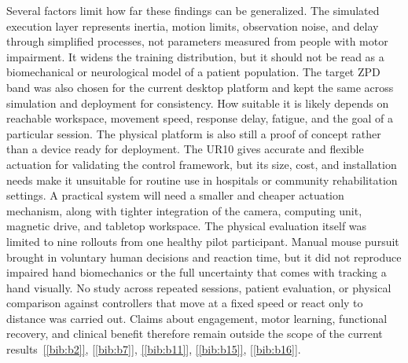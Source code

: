 \documentclass[journal,twoside,web]{ieeecolor2}
\newcommand{\citelink}[1]{\hyperref[bib:#1]{[\ref*{bib:#1}]}}
\begin{document}
Several factors limit how far these findings can be generalized. The simulated execution layer represents inertia, motion limits, observation noise, and delay through simplified processes, not parameters measured from people with motor impairment. It widens the training distribution, but it should not be read as a biomechanical or neurological model of a patient population. The target ZPD band was also chosen for the current desktop platform and kept the same across simulation and deployment for consistency. How suitable it is likely depends on reachable workspace, movement speed, response delay, fatigue, and the goal of a particular session. The physical platform is also still a proof of concept rather than a device ready for deployment. The UR10 gives accurate and flexible actuation for validating the control framework, but its size, cost, and installation needs make it unsuitable for routine use in hospitals or community rehabilitation settings. A practical system will need a smaller and cheaper actuation mechanism, along with tighter integration of the camera, computing unit, magnetic drive, and tabletop workspace. The physical evaluation itself was limited to nine rollouts from one healthy pilot participant. Manual mouse pursuit brought in voluntary human decisions and reaction time, but it did not reproduce impaired hand biomechanics or the full uncertainty that comes with tracking a hand visually. No study across repeated sessions, patient evaluation, or physical comparison against controllers that move at a fixed speed or react only to distance was carried out. Claims about engagement, motor learning, functional recovery, and clinical benefit therefore remain outside the scope of the current results~\citelink{b2}, \citelink{b7}, \citelink{b11}, \citelink{b15}, \citelink{b16}.
\end{document}
